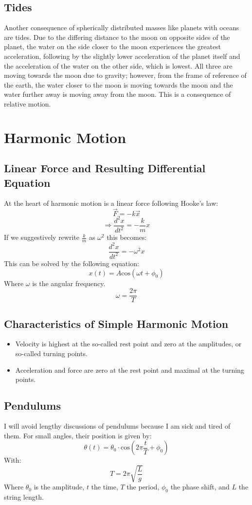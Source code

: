 \documentclass{article}
\begin{document}
\subsection{Tides} Another consequence of spherically distributed masses like planets with oceans are tides. Due to the differing distance to the moon on opposite sides of the planet, the water on the side closer to the moon experiences the greatest acceleration, following by the slightly lower acceleration of the planet itself and the acceleration of the water on the other side, which is lowest. All three are moving towards the moon due to gravity; however, from the frame of reference of the earth, the water closer to the moon is moving towards the moon and the water further away is moving away from the moon. This is a consequence of relative motion.

\pagebreak
\section{Harmonic Motion}
\subsection{Linear Force and Resulting Differential Equation}
At the heart of harmonic motion is a linear force following Hooke's law:
$$\vec{F}=-k\vec{x}$$
$$\Rightarrow \frac{d^2 x}{dt^2}=-\frac{k}{m} x$$
If we suggestively rewrite $\frac{k}{m}$ as $\omega^2$ this becomes:
$$\frac{d^2 x}{dt^2}=-\omega^2 x$$
This can be solved by the following equation:
$$x(t)=A\text{cos}(\omega t + \phi_0)$$
Where $\omega$ is the angular frequency. 
$$\omega=\frac{2\pi}{T}$$
\subsection{Characteristics of Simple Harmonic Motion} 
\begin{itemize}
    \item Velocity is highest at the so-called rest point and zero at the amplitudes, or so-called turning points.
    \item Acceleration and force are zero at the rest point and maximal at the turning points.
\end{itemize}
\subsection{Pendulums} I will avoid lengthy discussions of pendulums because I am sick and tired of them. For small angles, their position is given by:
$$\theta(t)=\theta_0\cdot \text{cos} \left( 2\pi \frac{t}{T} + \phi_0\right)$$
With:
$$T=2\pi \sqrt{\frac{L}{g}}$$
Where $\theta_0$ is the amplitude, $t$ the time, $T$ the period, $\phi_0$ the phase shift, and $L$ the string length.
\end{document}
